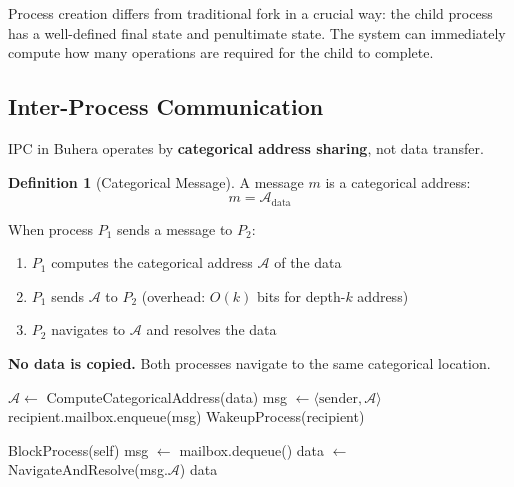 \documentclass[twocolumn,10pt]{article}
\theoremstyle{definition}
\newtheorem{definition}[theorem]{Definition}
\theoremstyle{remark}
\newcommand{\cataddr}{\mathcal{A}}
\begin{document}
Process creation differs from traditional fork in a crucial way: the child process has a well-defined final state and penultimate state. The system can immediately compute how many operations are required for the child to complete.

\subsection{Inter-Process Communication}

IPC in Buhera operates by \textbf{categorical address sharing}, not data transfer.

\begin{definition}[Categorical Message]
A message $m$ is a categorical address:
\begin{equation}
    m = \cataddr_{\text{data}}
\end{equation}
\end{definition}

When process $P_1$ sends a message to $P_2$:
\begin{enumerate}
    \item $P_1$ computes the categorical address $\cataddr$ of the data
    \item $P_1$ sends $\cataddr$ to $P_2$ (overhead: $O(k)$ bits for depth-$k$ address)
    \item $P_2$ navigates to $\cataddr$ and resolves the data
\end{enumerate}

\textbf{No data is copied.} Both processes navigate to the same categorical location.

\begin{algorithm}
\caption{Send Message}
\begin{algorithmic}[1]
    \State $\cataddr \gets$ ComputeCategoricalAddress(data)
    \State msg $\gets \langle \text{sender}, \cataddr \rangle$
    \State recipient.mailbox.enqueue(msg)
    \State WakeupProcess(recipient)
\EndFunction
\end{algorithmic}
\end{algorithm}

\begin{algorithm}
\caption{Receive Message}
\begin{algorithmic}[1]
        \State BlockProcess(self)
    \EndIf
    \State msg $\gets$ mailbox.dequeue()
    \State data $\gets$ NavigateAndResolve(msg.$\cataddr$)
    \State \Return data
\EndFunction
\end{algorithmic}
\end{algorithm}
\end{document}
